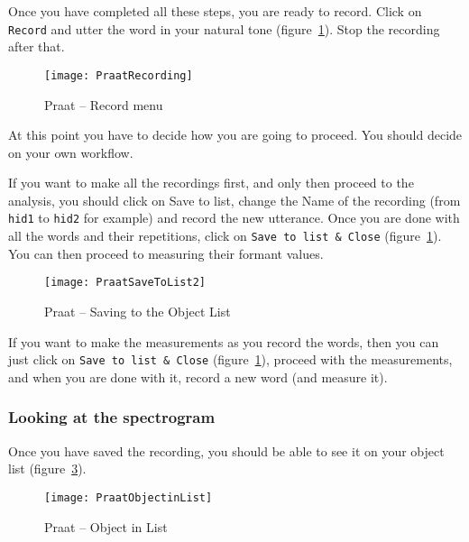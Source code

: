 \documentclass{article}
\newcommand{\soft}[1]{\textsf{#1}}
\newcommand{\softmenu}[1]{\texttt{#1}}
\newcommand{\Praat}{\soft{Praat}}
\begin{document}
Once you have completed all these steps, you are ready to record. Click on \softmenu{Record} and utter the word in your natural tone (figure~\ref{step2rec}). Stop the recording after that.

\begin{figure}[!tbp]
\caption{\Praat{} -- Record menu}
\label{step2rec}
	\begin{center}
		\texttt{[image: PraatRecording]}
	\end{center}
\end{figure}

At this point you have to decide how you are going to proceed. You should decide on your own workflow.

If you want to make all the recordings first, and only then proceed to the analysis, you should click on Save to list, change the Name of the recording (from \softmenu{hid1} to \softmenu{hid2} for example) and record the new utterance. Once you are done with all the words and their repetitions, click on \softmenu{Save to list \& Close} (figure~\ref{step2rec}). You can then proceed to measuring their formant values.

\begin{figure}[!tbp]
\caption{\Praat{} -- Saving to the Object List}
\label{step3rec}
	\begin{center}
		\texttt{[image: PraatSaveToList2]}
	\end{center}
\end{figure}

If you want to make the measurements as you record the words, then you can just click on \softmenu{Save to list \& Close} (figure~\ref{step2rec}), proceed with the measurements, and when you are done with it, record a new word (and measure it).


\subsubsection{Looking at the spectrogram}

Once you have saved the recording, you should be able to see it on your object list (figure~\ref{step1look}).

\begin{figure}[!tbp]
\caption{\Praat{} -- Object in List}
\label{step1look}
	\begin{center}
		\texttt{[image: PraatObjectinList]}
	\end{center}
\end{figure}
\end{document}

